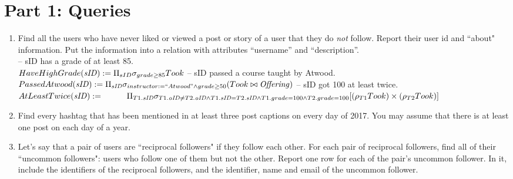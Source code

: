 \documentclass{article}
\newcommand{\var}[1]{\mathit{#1}}
\begin{document}
\section*{Part 1: Queries}

\begin{enumerate}

\item   %
Find all the users who have never liked or viewed a post or story 
of a user that they do {\it not} follow. 
Report their user id and ``about" information. 
Put the information into a relation with attributes ``username'' and ``description''. \\

{\large %
-- sID has a grade of at least 85. \\[5pt]
$
HaveHighGrade(\var{sID}) := 
	\Pi_{sID} 
	\sigma_{grade \ge 85} 
	Took \\[10pt]
$
-- sID passed a course taught by Atwood. \\[5pt]
$
PassedAtwood(\var{sID}) := 
	\Pi_{\var{sID}} 
	\sigma_{instructor := ``Atwood" \wedge grade \ge 50} 
	(Took \bowtie \var{Offering}) 
	\\[10pt]
$
-- sID got 100 at least twice. \\[5pt]
$
AtLeastTwice(\var{sID}) := \\[5pt]  %
	\hspace*{1cm}  %
	\Pi_{T1.\var{sID}} 
	\sigma_{
		T1.\var{oID} \neq T2.\var{oID} \wedge 
		T1.\var{sID} = T2.\var{sID} \wedge 
		T1.grade = 100 \wedge T2.grade = 100}
	[ (\rho_{T1}Took) \times (\rho_{T2}Took) ] \\[5pt]
$
} %


\item   %
Find every hashtag that has been mentioned in at least three post captions
on every day of 2017.
You may assume that there is at least one post on each day of a year. 

\item   %
Let's say that a pair of users are ``reciprocal followers" if they follow each other. 
For each pair of reciprocal followers, 
find all of their ``uncommon followers": 
users who follow one of them but not the other. 
Report one row for each of the pair's uncommon follower.
In it, include
the identifiers of the reciprocal followers,
and the identifier, name and email of the uncommon follower. 


\end{enumerate}
\end{document}
